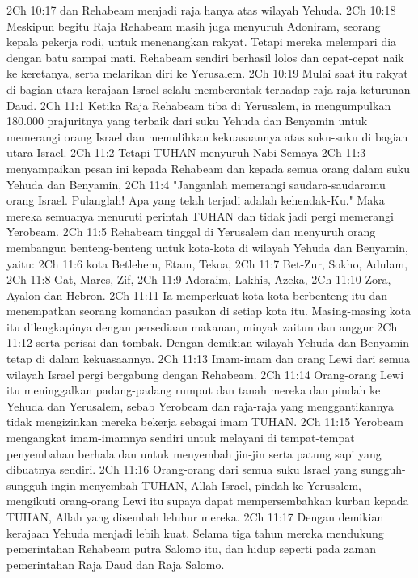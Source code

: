 2Ch 10:17  dan Rehabeam menjadi raja hanya atas wilayah Yehuda.
2Ch 10:18  Meskipun begitu Raja Rehabeam masih juga menyuruh Adoniram, seorang kepala pekerja rodi, untuk menenangkan rakyat. Tetapi mereka melempari dia dengan batu sampai mati. Rehabeam sendiri berhasil lolos dan cepat-cepat naik ke keretanya, serta melarikan diri ke Yerusalem.
2Ch 10:19  Mulai saat itu rakyat di bagian utara kerajaan Israel selalu memberontak terhadap raja-raja keturunan Daud.
2Ch 11:1  Ketika Raja Rehabeam tiba di Yerusalem, ia mengumpulkan 180.000 prajuritnya yang terbaik dari suku Yehuda dan Benyamin untuk memerangi orang Israel dan memulihkan kekuasaannya atas suku-suku di bagian utara Israel.
2Ch 11:2  Tetapi TUHAN menyuruh Nabi Semaya
2Ch 11:3  menyampaikan pesan ini kepada Rehabeam dan kepada semua orang dalam suku Yehuda dan Benyamin,
2Ch 11:4  "Janganlah memerangi saudara-saudaramu orang Israel. Pulanglah! Apa yang telah terjadi adalah kehendak-Ku." Maka mereka semuanya menuruti perintah TUHAN dan tidak jadi pergi memerangi Yerobeam.
2Ch 11:5  Rehabeam tinggal di Yerusalem dan menyuruh orang membangun benteng-benteng untuk kota-kota di wilayah Yehuda dan Benyamin, yaitu:
2Ch 11:6  kota Betlehem, Etam, Tekoa,
2Ch 11:7  Bet-Zur, Sokho, Adulam,
2Ch 11:8  Gat, Mares, Zif,
2Ch 11:9  Adoraim, Lakhis, Azeka,
2Ch 11:10  Zora, Ayalon dan Hebron.
2Ch 11:11  Ia memperkuat kota-kota berbenteng itu dan menempatkan seorang komandan pasukan di setiap kota itu. Masing-masing kota itu dilengkapinya dengan persediaan makanan, minyak zaitun dan anggur
2Ch 11:12  serta perisai dan tombak. Dengan demikian wilayah Yehuda dan Benyamin tetap di dalam kekuasaannya.
2Ch 11:13  Imam-imam dan orang Lewi dari semua wilayah Israel pergi bergabung dengan Rehabeam.
2Ch 11:14  Orang-orang Lewi itu meninggalkan padang-padang rumput dan tanah mereka dan pindah ke Yehuda dan Yerusalem, sebab Yerobeam dan raja-raja yang menggantikannya tidak mengizinkan mereka bekerja sebagai imam TUHAN.
2Ch 11:15  Yerobeam mengangkat imam-imamnya sendiri untuk melayani di tempat-tempat penyembahan berhala dan untuk menyembah jin-jin serta patung sapi yang dibuatnya sendiri.
2Ch 11:16  Orang-orang dari semua suku Israel yang sungguh-sungguh ingin menyembah TUHAN, Allah Israel, pindah ke Yerusalem, mengikuti orang-orang Lewi itu supaya dapat mempersembahkan kurban kepada TUHAN, Allah yang disembah leluhur mereka.
2Ch 11:17  Dengan demikian kerajaan Yehuda menjadi lebih kuat. Selama tiga tahun mereka mendukung pemerintahan Rehabeam putra Salomo itu, dan hidup seperti pada zaman pemerintahan Raja Daud dan Raja Salomo.
